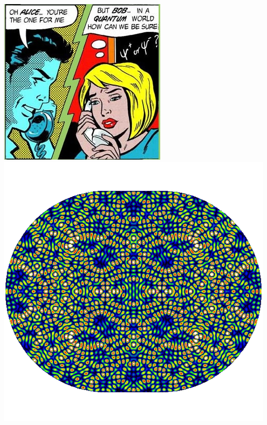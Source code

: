 \documentclass[pdftex,12pt, letterpaper]{report}
\begin{document}
\begin{titlepage}
\begin{center}
\newcommand{\hola}{0.48\textwidth}
\newcommand{\spaceitems}{1.5cm}
\newcommand{\adios}{0.25\textwidth}

\begin{minipage}[c]{\adios}
\includegraphics[width=\textwidth]{Quantum_information_image.jpg}
\includegraphics[width=\textwidth]{typicalstadium.png}

\end{minipage}
\end{center}
\end{titlepage}
\end{document}
